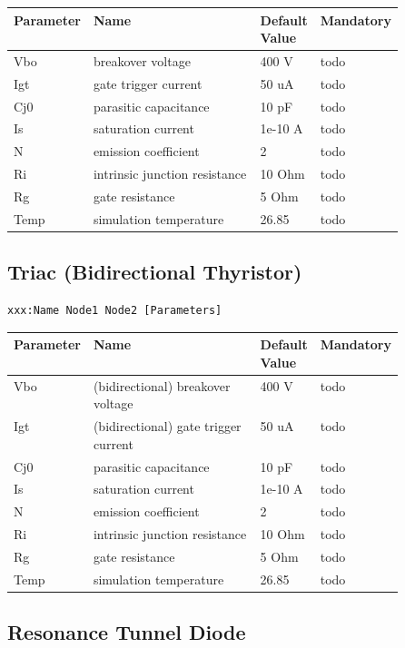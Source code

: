 \begin{tabular}{|l|p{0.5\linewidth}|l|l|}
\hline
Parameter & Name & Default Value & Mandatory \\
\hline
Vbo & breakover voltage & 400 V & todo \\
Igt & gate trigger current & 50 uA & todo \\
Cj0 & parasitic capacitance & 10 pF & todo \\
Is & saturation current & 1e-10 A & todo \\
N & emission coefficient & 2 & todo \\
Ri & intrinsic junction resistance & 10 Ohm & todo \\
Rg & gate resistance & 5 Ohm & todo \\
Temp & simulation temperature & 26.85 & todo \\
\hline
\end{tabular}


\subsection{Triac (Bidirectional Thyristor)}

\begin{verbatim}
xxx:Name Node1 Node2 [Parameters]
\end{verbatim}


\begin{tabular}{|l|p{0.5\linewidth}|l|l|}
\hline
Parameter & Name & Default Value & Mandatory \\
\hline
Vbo & (bidirectional) breakover voltage & 400 V & todo \\
Igt & (bidirectional) gate trigger current & 50 uA & todo \\
Cj0 & parasitic capacitance & 10 pF & todo \\
Is & saturation current & 1e-10 A & todo \\
N & emission coefficient & 2 & todo \\
Ri & intrinsic junction resistance & 10 Ohm & todo \\
Rg & gate resistance & 5 Ohm & todo \\
Temp & simulation temperature & 26.85 & todo \\
\hline
\end{tabular}



\subsection{Resonance Tunnel Diode}

